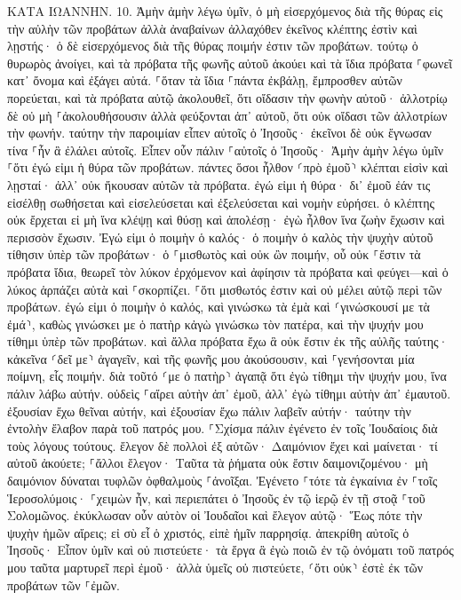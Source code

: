 \documentclass[twoside, 9pt]{extreport}
\begin{document}
ΚΑΤΑ ΙΩΑΝΝΗΝ.
10.
Ἀμὴν ἀμὴν λέγω ὑμῖν, ὁ μὴ εἰσερχόμενος διὰ τῆς θύρας εἰς τὴν αὐλὴν τῶν προβάτων ἀλλὰ ἀναβαίνων ἀλλαχόθεν ἐκεῖνος κλέπτης ἐστὶν καὶ λῃστής· 
ὁ δὲ εἰσερχόμενος διὰ τῆς θύρας ποιμήν ἐστιν τῶν προβάτων. 
τούτῳ ὁ θυρωρὸς ἀνοίγει, καὶ τὰ πρόβατα τῆς φωνῆς αὐτοῦ ἀκούει καὶ τὰ ἴδια πρόβατα ⸀φωνεῖ κατ᾽ ὄνομα καὶ ἐξάγει αὐτά. 
⸀ὅταν τὰ ἴδια ⸀πάντα ἐκβάλῃ, ἔμπροσθεν αὐτῶν πορεύεται, καὶ τὰ πρόβατα αὐτῷ ἀκολουθεῖ, ὅτι οἴδασιν τὴν φωνὴν αὐτοῦ· 
ἀλλοτρίῳ δὲ οὐ μὴ ⸀ἀκολουθήσουσιν ἀλλὰ φεύξονται ἀπ᾽ αὐτοῦ, ὅτι οὐκ οἴδασι τῶν ἀλλοτρίων τὴν φωνήν. 
ταύτην τὴν παροιμίαν εἶπεν αὐτοῖς ὁ Ἰησοῦς· ἐκεῖνοι δὲ οὐκ ἔγνωσαν τίνα ⸀ἦν ἃ ἐλάλει αὐτοῖς. 
Εἶπεν οὖν πάλιν ⸀αὐτοῖς ὁ Ἰησοῦς· Ἀμὴν ἀμὴν λέγω ὑμῖν ⸀ὅτι ἐγώ εἰμι ἡ θύρα τῶν προβάτων. 
πάντες ὅσοι ἦλθον ⸂πρὸ ἐμοῦ⸃ κλέπται εἰσὶν καὶ λῃσταί· ἀλλ᾽ οὐκ ἤκουσαν αὐτῶν τὰ πρόβατα. 
ἐγώ εἰμι ἡ θύρα· δι᾽ ἐμοῦ ἐάν τις εἰσέλθῃ σωθήσεται καὶ εἰσελεύσεται καὶ ἐξελεύσεται καὶ νομὴν εὑρήσει. 
ὁ κλέπτης οὐκ ἔρχεται εἰ μὴ ἵνα κλέψῃ καὶ θύσῃ καὶ ἀπολέσῃ· ἐγὼ ἦλθον ἵνα ζωὴν ἔχωσιν καὶ περισσὸν ἔχωσιν. 
Ἐγώ εἰμι ὁ ποιμὴν ὁ καλός· ὁ ποιμὴν ὁ καλὸς τὴν ψυχὴν αὐτοῦ τίθησιν ὑπὲρ τῶν προβάτων· 
ὁ ⸀μισθωτὸς καὶ οὐκ ὢν ποιμήν, οὗ οὐκ ⸀ἔστιν τὰ πρόβατα ἴδια, θεωρεῖ τὸν λύκον ἐρχόμενον καὶ ἀφίησιν τὰ πρόβατα καὶ φεύγει—καὶ ὁ λύκος ἁρπάζει αὐτὰ καὶ ⸀σκορπίζει. 
⸀ὅτι μισθωτός ἐστιν καὶ οὐ μέλει αὐτῷ περὶ τῶν προβάτων. 
ἐγώ εἰμι ὁ ποιμὴν ὁ καλός, καὶ γινώσκω τὰ ἐμὰ καὶ ⸂γινώσκουσί με τὰ ἐμά⸃, 
καθὼς γινώσκει με ὁ πατὴρ κἀγὼ γινώσκω τὸν πατέρα, καὶ τὴν ψυχήν μου τίθημι ὑπὲρ τῶν προβάτων. 
καὶ ἄλλα πρόβατα ἔχω ἃ οὐκ ἔστιν ἐκ τῆς αὐλῆς ταύτης· κἀκεῖνα ⸂δεῖ με⸃ ἀγαγεῖν, καὶ τῆς φωνῆς μου ἀκούσουσιν, καὶ ⸀γενήσονται μία ποίμνη, εἷς ποιμήν. 
διὰ τοῦτό ⸂με ὁ πατὴρ⸃ ἀγαπᾷ ὅτι ἐγὼ τίθημι τὴν ψυχήν μου, ἵνα πάλιν λάβω αὐτήν. 
οὐδεὶς ⸀αἴρει αὐτὴν ἀπ᾽ ἐμοῦ, ἀλλ᾽ ἐγὼ τίθημι αὐτὴν ἀπ᾽ ἐμαυτοῦ. ἐξουσίαν ἔχω θεῖναι αὐτήν, καὶ ἐξουσίαν ἔχω πάλιν λαβεῖν αὐτήν· ταύτην τὴν ἐντολὴν ἔλαβον παρὰ τοῦ πατρός μου. 
⸀Σχίσμα πάλιν ἐγένετο ἐν τοῖς Ἰουδαίοις διὰ τοὺς λόγους τούτους. 
ἔλεγον δὲ πολλοὶ ἐξ αὐτῶν· Δαιμόνιον ἔχει καὶ μαίνεται· τί αὐτοῦ ἀκούετε; 
⸀ἄλλοι ἔλεγον· Ταῦτα τὰ ῥήματα οὐκ ἔστιν δαιμονιζομένου· μὴ δαιμόνιον δύναται τυφλῶν ὀφθαλμοὺς ⸀ἀνοῖξαι. 
Ἐγένετο ⸀τότε τὰ ἐγκαίνια ἐν ⸀τοῖς Ἱεροσολύμοις· ⸀χειμὼν ἦν, 
καὶ περιεπάτει ὁ Ἰησοῦς ἐν τῷ ἱερῷ ἐν τῇ στοᾷ ⸀τοῦ Σολομῶνος. 
ἐκύκλωσαν οὖν αὐτὸν οἱ Ἰουδαῖοι καὶ ἔλεγον αὐτῷ· Ἕως πότε τὴν ψυχὴν ἡμῶν αἴρεις; εἰ σὺ εἶ ὁ χριστός, εἰπὲ ἡμῖν παρρησίᾳ. 
ἀπεκρίθη αὐτοῖς ὁ Ἰησοῦς· Εἶπον ὑμῖν καὶ οὐ πιστεύετε· τὰ ἔργα ἃ ἐγὼ ποιῶ ἐν τῷ ὀνόματι τοῦ πατρός μου ταῦτα μαρτυρεῖ περὶ ἐμοῦ· 
ἀλλὰ ὑμεῖς οὐ πιστεύετε, ⸂ὅτι οὐκ⸃ ἐστὲ ἐκ τῶν προβάτων τῶν ⸀ἐμῶν. 
\end{document}
